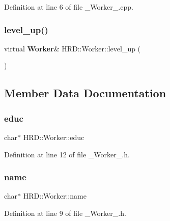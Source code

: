 Definition at line 6 of file \+\_\+\+Worker\+\_\+.\+cpp.

\mbox{\label{class_h_r_d_1_1_worker_a67f5d9cc2dd74d1722419fca51d81770}} 
\subsubsection{level\+\_\+up()}
{\footnotesize\ttfamily virtual \textbf{ Worker}\& H\+R\+D\+::\+Worker\+::level\+\_\+up (\begin{DoxyParamCaption}{ }\end{DoxyParamCaption})\hspace{0.3cm}{\ttfamily [pure virtual]}}



\subsection{Member Data Documentation}
\mbox{\label{class_h_r_d_1_1_worker_afdea20210e05fd323929277bbbd59b55}} 
\subsubsection{educ}
{\footnotesize\ttfamily char$\ast$ H\+R\+D\+::\+Worker\+::educ\hspace{0.3cm}{\ttfamily [protected]}}



Definition at line 12 of file \+\_\+\+Worker\+\_\+.\+h.

\mbox{\label{class_h_r_d_1_1_worker_af94f6c3ee6d8a33d6383fcc71ec90c51}} 
\subsubsection{name}
{\footnotesize\ttfamily char$\ast$ H\+R\+D\+::\+Worker\+::name\hspace{0.3cm}{\ttfamily [protected]}}



Definition at line 9 of file \+\_\+\+Worker\+\_\+.\+h.

\mbox{\label{class_h_r_d_1_1_worker_a3d4dbc1be974cd3862be4b300a29d16f}} 

